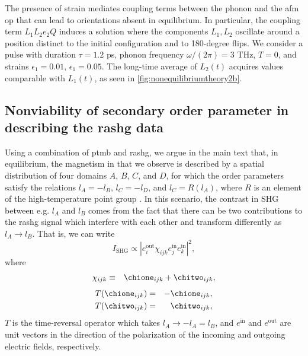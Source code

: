 The presence of strain mediates coupling terms between the phonon and the \gls{afm} \gls{op} that can lead to orientations absent in equilibrium.
In particular, the coupling term $L_1 L_2 e_2 Q$ induces a solution where the components $L_1, L_2$ oscillate around a position distinct to the initial configuration and to 180-degree flips.
We consider a pulse with duration $\tau = 1.2$ \si{ps}, phonon frequency $\omega/(2\pi) = 3$ \si{THz}, $T=0$, and strains $\epsilon_1 = 0.01$, $\epsilon_1 = 0.05$.
The long-time average of $L_2(t)$ acquires values comparable with $L_1(t)$, as seen in \cref{fig:nonequilibriumtheory2b}. 

\subsection{Nonviability of secondary order parameter in describing the \gls{rashg} data}\label{sec:alternativeinterpretation}

Using a combination of \gls{ptmb} and \gls{rashg}, we argue in the main text that, in equilibrium, the magnetism in \cmb that we observe is described by a spatial distribution of four domains $A$, $B$, $C$, and $D$, for which the order parameters satisfy the relations $l_A = -l_B$, $l_C = -l_D$, and $l_C = R(l_A)$, where $R$ is an element of the high-temperature point group \htpg.
In this scenario, the contrast in SHG between e.g. $l_A$ and $l_B$ comes from the fact that there can be two contributions to the \gls{rashg} signal which interfere with each other and transform differently as $l_A \rightarrow l_B$.
That is, we can write
\begin{equation}
I_\mathrm{SHG} \propto |e^\mathrm{out}_i \chi_{ijk} e^\mathrm{in}_j e^\mathrm{in}_k|^2,
\end{equation}
where
\begin{equation}
\begin{aligned}
\chi_{ijk} &\equiv &&\chione_{ijk} + \chitwo_{ijk}, \\
\end{aligned}
\end{equation}
\begin{equation}
\label{eq:trrelations}
\begin{aligned}
T (\chione_{ijk}) &= &-&\chione_{ijk}, \\
T (\chitwo_{ijk}) &= &&\chitwo_{ijk},
\end{aligned}
\end{equation}
$T$ is the time-reversal operator which takes $l_A \rightarrow -l_A = l_B$, and $e^\mathrm{in}$ and $e^\mathrm{out}$ are unit vectors in the direction of the polarization of the incoming and outgoing electric fields, respectively.

